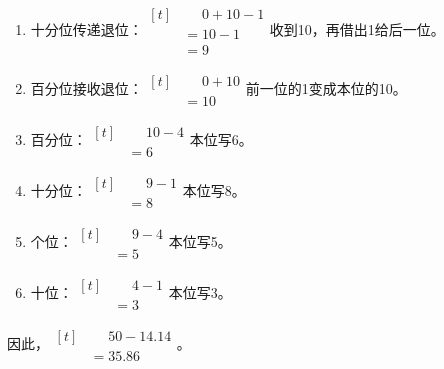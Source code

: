 {\begin{enumerate}[leftmargin=1.7em,itemsep=5pt,topsep=0pt]
\item 十分位传递退位：\(\begin{aligned}[t]&\phantom{={}}0+10-1\\&=10-1\\&=9\end{aligned}\)\quad 收到10，再借出1给后一位。
\item 百分位接收退位：\(\begin{aligned}[t]&\phantom{={}}0+10\\&=10\end{aligned}\)\quad 前一位的1变成本位的10。
\item 百分位：\(\begin{aligned}[t]&\phantom{={}}10-4\\&=6\end{aligned}\)\quad 本位写6。
\item 十分位：\(\begin{aligned}[t]&\phantom{={}}9-1\\&=8\end{aligned}\)\quad 本位写8。
\item 个位：\(\begin{aligned}[t]&\phantom{={}}9-4\\&=5\end{aligned}\)\quad 本位写5。
\item 十位：\(\begin{aligned}[t]&\phantom{={}}4-1\\&=3\end{aligned}\)\quad 本位写3。
\end{enumerate}
\par\smallskip
因此，\(\begin{aligned}[t]&\phantom{={}}50-14.14\\&=35.86\end{aligned}\)。
\par\medskip

}
